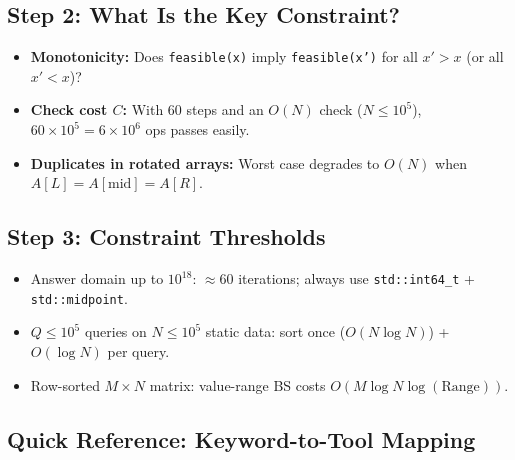 \documentclass[11pt,a4paper]{article}
\theoremstyle{definition}
\begin{document}
\subsection*{Step 2: What Is the Key Constraint?}
\begin{itemize}
    \item \textbf{Monotonicity:} Does \texttt{feasible(x)} imply \texttt{feasible(x')} for all $x' > x$ (or all $x' < x$)?
    \item \textbf{Check cost $C$:} With $60$ steps and an $O(N)$ check ($N \le 10^5$), $60 \times 10^5 = 6 \times 10^6$ ops passes easily.
    \item \textbf{Duplicates in rotated arrays:} Worst case degrades to $O(N)$ when $A[L] = A[\text{mid}] = A[R]$.
\end{itemize}

\subsection*{Step 3: Constraint Thresholds}
\begin{itemize}
    \item Answer domain up to $10^{18}$: $\approx 60$ iterations; always use \texttt{std::int64\_t} + \texttt{std::midpoint}.
    \item $Q \le 10^5$ queries on $N \le 10^5$ static data: sort once ($O(N \log N)$) + $O(\log N)$ per query.
    \item Row-sorted $M \times N$ matrix: value-range BS costs $O(M \log N \log(\text{Range}))$.
\end{itemize}

\subsection*{Quick Reference: Keyword-to-Tool Mapping}
\end{document}
